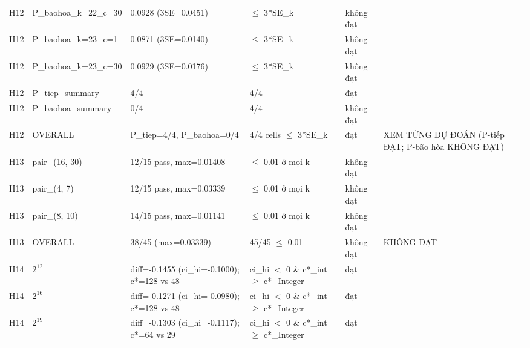 \begin{longtable}{p{0.8cm}p{2.2cm}p{3.9cm}p{3.2cm}p{1.1cm}p{2.4cm}}
H12 & P\_\allowbreak{}baohoa\_\allowbreak{}k=\allowbreak{}22\_\allowbreak{}c=\allowbreak{}30 & 0.0928 (3SE=\allowbreak{}0.0451) & $\le$\allowbreak{} 3*SE\_\allowbreak{}k & không đạt &  \\
H12 & P\_\allowbreak{}baohoa\_\allowbreak{}k=\allowbreak{}23\_\allowbreak{}c=\allowbreak{}1 & 0.0871 (3SE=\allowbreak{}0.0140) & $\le$\allowbreak{} 3*SE\_\allowbreak{}k & không đạt &  \\
H12 & P\_\allowbreak{}baohoa\_\allowbreak{}k=\allowbreak{}23\_\allowbreak{}c=\allowbreak{}30 & 0.0929 (3SE=\allowbreak{}0.0176) & $\le$\allowbreak{} 3*SE\_\allowbreak{}k & không đạt &  \\
H12 & P\_\allowbreak{}tiep\_\allowbreak{}summary & 4/4 & 4/4 & đạt &  \\
H12 & P\_\allowbreak{}baohoa\_\allowbreak{}summary & 0/4 & 4/4 & không đạt &  \\
H12 & OVERALL & P\_\allowbreak{}tiep=\allowbreak{}4/4, P\_\allowbreak{}baohoa=\allowbreak{}0/4 & 4/4 cells $\le$\allowbreak{} 3*SE\_\allowbreak{}k & đạt & XEM TỪNG DỰ ĐOÁN (P-tiếp ĐẠT; P-bão hòa KHÔNG ĐẠT) \\
H13 & pair\_\allowbreak{}(16, 30) & 12/15 pass, max=\allowbreak{}0.01408 & $\le$\allowbreak{} 0.01 ở mọi k & không đạt &  \\
H13 & pair\_\allowbreak{}(4, 7) & 12/15 pass, max=\allowbreak{}0.03339 & $\le$\allowbreak{} 0.01 ở mọi k & không đạt &  \\
H13 & pair\_\allowbreak{}(8, 10) & 14/15 pass, max=\allowbreak{}0.01141 & $\le$\allowbreak{} 0.01 ở mọi k & không đạt &  \\
H13 & OVERALL & 38/45 (max=\allowbreak{}0.03339) & 45/45 $\le$\allowbreak{} 0.01 & không đạt & KHÔNG ĐẠT \\
H14 & $2^{12}$ & diff=\allowbreak{}-0.1455 (ci\_\allowbreak{}hi=\allowbreak{}-0.1000); c*=\allowbreak{}128 vs 48 & ci\_\allowbreak{}hi $<$\allowbreak{} 0 \& c*\_\allowbreak{}int $\ge$\allowbreak{} c*\_\allowbreak{}Integer & đạt &  \\
H14 & $2^{16}$ & diff=\allowbreak{}-0.1271 (ci\_\allowbreak{}hi=\allowbreak{}-0.0980); c*=\allowbreak{}128 vs 48 & ci\_\allowbreak{}hi $<$\allowbreak{} 0 \& c*\_\allowbreak{}int $\ge$\allowbreak{} c*\_\allowbreak{}Integer & đạt &  \\
H14 & $2^{19}$ & diff=\allowbreak{}-0.1303 (ci\_\allowbreak{}hi=\allowbreak{}-0.1117); c*=\allowbreak{}64 vs 29 & ci\_\allowbreak{}hi $<$\allowbreak{} 0 \& c*\_\allowbreak{}int $\ge$\allowbreak{} c*\_\allowbreak{}Integer & đạt &  \\

\end{longtable}
